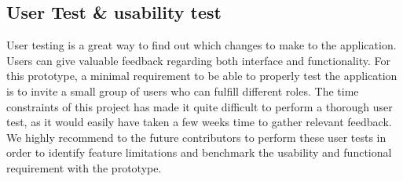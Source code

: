 \subsection{User Test \& usability test} %
\label{sub:user_test}
User testing is a great way to find out which changes to make to the application. Users can give valuable feedback regarding both interface and functionality. For this prototype, a minimal requirement to be able to properly test the application is to invite a small group of users who can fulfill different roles. The time constraints of this project has made it quite difficult to perform a thorough user test, as it would easily have taken a few weeks time to gather relevant feedback. We highly recommend to the future contributors to perform these user tests in order to identify feature limitations and benchmark the usability and functional requirement with the prototype.
